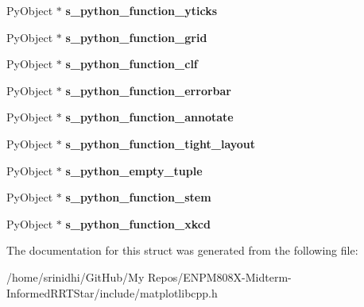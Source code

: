 \begin{DoxyCompactItemize}
\item 
Py\+Object $\ast$ {\bfseries s\+\_\+python\+\_\+function\+\_\+yticks}\hypertarget{structmatplotlibcpp_1_1detail_1_1__interpreter_ae1a95f666a22a9a6a49ad26e15635201}{}\label{structmatplotlibcpp_1_1detail_1_1__interpreter_ae1a95f666a22a9a6a49ad26e15635201}

\item 
Py\+Object $\ast$ {\bfseries s\+\_\+python\+\_\+function\+\_\+grid}\hypertarget{structmatplotlibcpp_1_1detail_1_1__interpreter_a38630747267b258d93229eaea64610eb}{}\label{structmatplotlibcpp_1_1detail_1_1__interpreter_a38630747267b258d93229eaea64610eb}

\item 
Py\+Object $\ast$ {\bfseries s\+\_\+python\+\_\+function\+\_\+clf}\hypertarget{structmatplotlibcpp_1_1detail_1_1__interpreter_a072f6b7a261385e68f773c3f74622d96}{}\label{structmatplotlibcpp_1_1detail_1_1__interpreter_a072f6b7a261385e68f773c3f74622d96}

\item 
Py\+Object $\ast$ {\bfseries s\+\_\+python\+\_\+function\+\_\+errorbar}\hypertarget{structmatplotlibcpp_1_1detail_1_1__interpreter_a082b7b746d5ebe138b1a136944d0a4ca}{}\label{structmatplotlibcpp_1_1detail_1_1__interpreter_a082b7b746d5ebe138b1a136944d0a4ca}

\item 
Py\+Object $\ast$ {\bfseries s\+\_\+python\+\_\+function\+\_\+annotate}\hypertarget{structmatplotlibcpp_1_1detail_1_1__interpreter_af63d49cff0820f3324b12da812c9a266}{}\label{structmatplotlibcpp_1_1detail_1_1__interpreter_af63d49cff0820f3324b12da812c9a266}

\item 
Py\+Object $\ast$ {\bfseries s\+\_\+python\+\_\+function\+\_\+tight\+\_\+layout}\hypertarget{structmatplotlibcpp_1_1detail_1_1__interpreter_a72965ea88b282bf62b41ca126341d9a8}{}\label{structmatplotlibcpp_1_1detail_1_1__interpreter_a72965ea88b282bf62b41ca126341d9a8}

\item 
Py\+Object $\ast$ {\bfseries s\+\_\+python\+\_\+empty\+\_\+tuple}\hypertarget{structmatplotlibcpp_1_1detail_1_1__interpreter_aaedba936be3a7e8fbcc528991ccace2c}{}\label{structmatplotlibcpp_1_1detail_1_1__interpreter_aaedba936be3a7e8fbcc528991ccace2c}

\item 
Py\+Object $\ast$ {\bfseries s\+\_\+python\+\_\+function\+\_\+stem}\hypertarget{structmatplotlibcpp_1_1detail_1_1__interpreter_a37ac2b6b54f49af43a82115e0d752f98}{}\label{structmatplotlibcpp_1_1detail_1_1__interpreter_a37ac2b6b54f49af43a82115e0d752f98}

\item 
Py\+Object $\ast$ {\bfseries s\+\_\+python\+\_\+function\+\_\+xkcd}\hypertarget{structmatplotlibcpp_1_1detail_1_1__interpreter_ac94dda0fc02bf1c7c4af3759c46ea8d7}{}\label{structmatplotlibcpp_1_1detail_1_1__interpreter_ac94dda0fc02bf1c7c4af3759c46ea8d7}

\end{DoxyCompactItemize}


The documentation for this struct was generated from the following file\+:\begin{DoxyCompactItemize}
\item 
/home/srinidhi/\+Git\+Hub/\+My Repos/\+E\+N\+P\+M808\+X-\/\+Midterm-\/\+Informed\+R\+R\+T\+Star/include/matplotlibcpp.\+h\end{DoxyCompactItemize}
